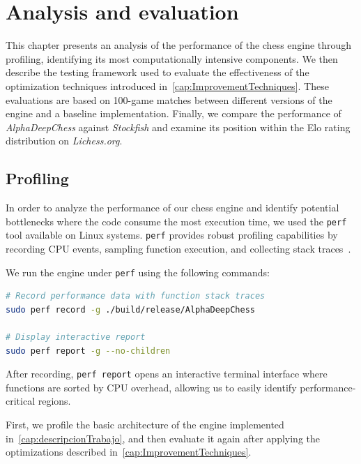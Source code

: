\chapter{Analysis and evaluation}\label{cap:analysis}

This chapter presents an analysis of the performance of the chess engine through profiling, identifying its most computationally intensive components. We then describe the testing framework used to evaluate the effectiveness of the optimization techniques introduced in~\cref{cap:ImprovementTechniques}. These evaluations are based on 100-game matches between different versions of the engine and a baseline implementation. Finally, we compare the performance of \textit{AlphaDeepChess} against \textit{Stockfish} and examine its position within the Elo rating distribution on \textit{Lichess.org}.

\section{Profiling}
In order to analyze the performance of our chess engine and identify potential bottlenecks where the code consume the most execution time, we used the \texttt{perf} tool available on Linux systems. \texttt{perf} provides robust profiling capabilities by recording CPU events, sampling function execution, and collecting stack traces~\cite{PerfLinux}. 

\vspace{1em}

\noindent We run the engine under \texttt{perf} using the following commands:

\begin{lstlisting}[language=bash, caption={Profiling \textit{AlphaDeepChess} with perf}, frame=single, breaklines=true]
# Record performance data with function stack traces
sudo perf record -g ./build/release/AlphaDeepChess

# Display interactive report
sudo perf report -g --no-children
\end{lstlisting}

\noindent After recording, \texttt{perf report} opens an interactive terminal interface where functions are sorted by CPU overhead, allowing us to easily identify performance-critical regions.

\vspace{2em}

\noindent First, we profile the basic architecture of the engine implemented in~\cref{cap:descripcionTrabajo}, and then evaluate it again after applying the optimizations described in~\cref{cap:ImprovementTechniques}.

